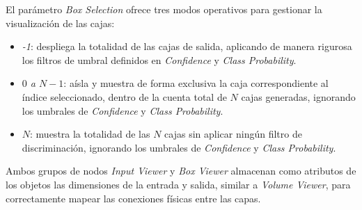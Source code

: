 El parámetro \textit{Box Selection} ofrece tres modos operativos para gestionar la visualización 
de las cajas:
\begin{itemize}
    \item \textit{-1}: despliega la totalidad de las cajas de salida, aplicando de manera rigurosa 
    los filtros de umbral definidos en \textit{Confidence} y \textit{Class Probability}.
    \item \textit{$0$ a $N-1$}: aísla y muestra de forma exclusiva la caja correspondiente al índice 
    seleccionado, dentro de la cuenta total de $N$ cajas generadas, ignorando los umbrales
    de \textit{Confidence} y \textit{Class Probability}.
    \item \textit{$N$}: muestra la totalidad de las $N$ cajas sin aplicar ningún filtro de 
    discriminación, ignorando los umbrales de \textit{Confidence} y \textit{Class Probability}.
\end{itemize}

Ambos grupos de nodos \textit{Input Viewer} y \textit{Box Viewer} almacenan como atributos de los
objetos las dimensiones de la entrada y salida, similar a \textit{Volume Viewer}, para correctamente
mapear las conexiones físicas entre las capas.